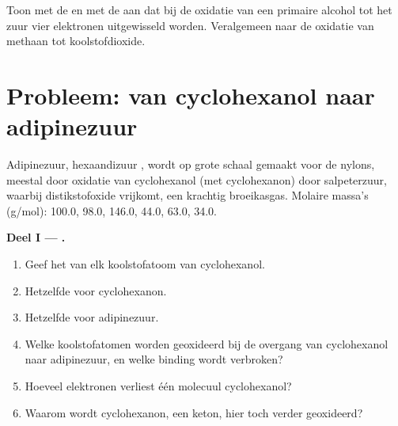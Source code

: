 \begin{exercise}[$\star\star\star$]\label{exo:b1:organic-redox:12}
Toon met de  en met de  aan dat bij de
oxidatie van een primaire alcohol tot het zuur vier elektronen
uitgewisseld worden. Veralgemeen naar de oxidatie van methaan tot
koolstofdioxide.
\end{exercise}

\section{Probleem: van cyclohexanol naar adipinezuur}

\begin{problem}
\label{pb:b1:organic-redox:1}
Adipinezuur, hexaandizuur , wordt op grote schaal
gemaakt voor de nylons, meestal door oxidatie van cyclohexanol (met
cyclohexanon) door salpeterzuur, waarbij distikstofoxide 
vrijkomt, een krachtig broeikasgas. Molaire massa's (\unit{g/mol}):
 100.0,  98.0,  146.0,  44.0,
 63.0,  34.0.

\medskip
\noindent\textbf{Deel I --- .}
\begin{enumerate}
  \item Geef het  van elk koolstofatoom van cyclohexanol.
  \item Hetzelfde voor cyclohexanon.
  \item Hetzelfde voor adipinezuur.
  \item Welke koolstofatomen worden geoxideerd bij de overgang van
        cyclohexanol naar adipinezuur, en welke binding wordt verbroken?
  \item Hoeveel elektronen verliest één molecuul cyclohexanol?
  \item Waarom wordt cyclohexanon, een keton, hier toch verder
        geoxideerd?
\end{enumerate}


\end{problem}
